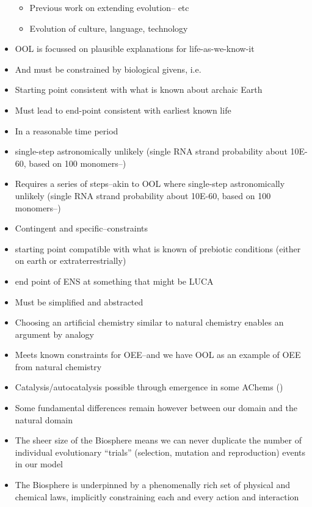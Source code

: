 \begin{itemize}
		\begin{itemize}
			\item
			Previous work on extending evolution--\autocite{Bourrat2015} etc
			\item
			Evolution of culture, language, technology
		\end{itemize}
		\item
		OOL is focussed on plausible explanations for life-as-we-know-it
		\item
		And must be constrained by biological givens, i.e.
		\item
		Starting point consistent with what is known about archaic Earth
		\item
		Must lead to end-point consistent with earliest known life
		\item
		In a reasonable time period
		\item
		single-step astronomically unlikely (single RNA strand probability
		about 10E-60, based on 100 monomers--\autocite{Pascal2013})
		\item
		Requires a series of steps--akin to OOL where single-step
		astronomically unlikely (single RNA strand probability about 10E-60,
		based on 100 monomers--\autocite{Pascal2013})
		\item
		Contingent and specific--constraints
		\item
		starting point compatible with what is known of prebiotic conditions
		(either on earth or extraterrestrially)
		\item
		end point of ENS at something that might be LUCA
		\item
		Must be simplified and abstracted
		\item
		Choosing an artificial chemistry similar to natural chemistry enables
		an argument by analogy
		\item
		Meets known constraints for OEE--and we have OOL as an example of OEE
		from natural chemistry
		\item
		Catalysis/autocatalysis possible through emergence in some AChems
		(\eg \autocite{Virgo2013})
		\item
		Some fundamental differences remain however between our domain and the
		natural domain
		\item
		The sheer size of the Biosphere means we can never duplicate the
		number of individual evolutionary ``trials'' (selection, mutation and
		reproduction) events in our model
		\item
		The Biosphere is underpinned by a phenomenally rich set of physical
		and chemical laws, implicitly constraining each and every action and
		interaction
	\end{itemize}
	
